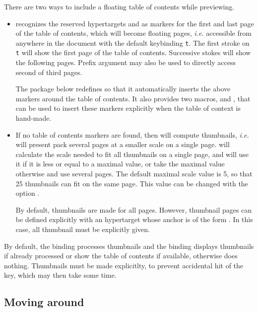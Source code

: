 \documentclass[12pt]{article}
\begin{document}
There are two ways to include a floating table of contents while previewing. 
\begin {itemize}

\item
{\ActiveDVI} recognizes the reserved hypertargets 
and  as markers for the first and last page of the table
of contents, which will become floating pages, {\em i.e.} accessible from
anywhere in the document with the default keybinding \verb't'.
The first stroke on \verb't' will show the first page of the table of
contents. Successive stokes will show the following pages. Prefix argument 
may also be used to directly access second of third pages. 

The package  below redefines
{\docdef \tableofcontents} so that it automatically inserts the above
markers around the table of contents. It also provides two macros, {\docdef
\advitoc} and \docdef \endadvitoc, that can be used to insert these markers
explicitly when the table of context is hand-made.

\item
If no table of contents markers are found, then {\ActiveDVI} will
compute thumbnails, {\em i.e.} will present pack several pages at a smaller 
scale on a single page. {\ActiveDVI} will calculate the scale needed to 
fit all thumbnails on a single page, and will use it if it is 
less or equal to a maximal value, or take the maximal value otherwise
and use several pages. The default maximal scale value is 5, so that
25 thumbnails can fit on the same page. This value can be changed with the
option .  

By default, thumbnails are made for all pages. However, thumbnail pages can
be defined explicitly with an hypertarget whose anchor is of the form
. In this case, all thumbnail must be explicitly
given.

\end {itemize}
By default, the binding  processes thumbnails and the binding
  displays thumbnails if already processed or show the table of
contents if available, otherwise does nothing. Thumbnails must be made
explicitlty, to prevent accidental hit of the key, which may then 
take some time.


\subsection{Moving around}
\end{document}
